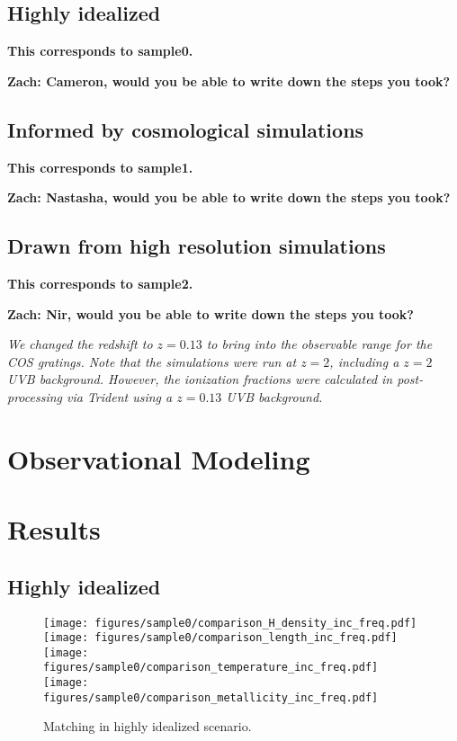 \documentclass[fleqn,usenatbib]{mnras}
\newcommand{\zach}[1]{\textcolor{BurntOrange}{\textbf{Zach: #1}}}
\begin{document}
\subsection{Highly idealized}

\textbf{This corresponds to sample0.}

\zach{Cameron, would you be able to write down the steps you took?}

\subsection{Informed by cosmological simulations}

\textbf{This corresponds to sample1.}

\zach{Nastasha, would you be able to write down the steps you took?}

\subsection{Drawn from high resolution simulations}

\textbf{This corresponds to sample2.}

\zach{Nir, would you be able to write down the steps you took?}

\textit{
We changed the redshift to $z=0.13$ to bring  into the observable range for the COS gratings.
Note that the simulations were run at $z=2$, including a $z=2$ UVB background.
However, the ionization fractions were calculated in post-processing via Trident using a $z=0.13$ UVB background.
}

\section{Observational Modeling}

\section{Results}

\subsection{Highly idealized}

\begin{figure*}
    \centering
    \texttt{[image: figures/sample0/comparison\_H\_density\_inc\_freq.pdf]}
    \texttt{[image: figures/sample0/comparison\_length\_inc\_freq.pdf]}
    \texttt{[image: figures/sample0/comparison\_temperature\_inc\_freq.pdf]}
    \texttt{[image: figures/sample0/comparison\_metallicity\_inc\_freq.pdf]}
    \caption{
    Matching in highly idealized scenario.
    }
    \label{f: idealized}
\end{figure*}
\end{document}
